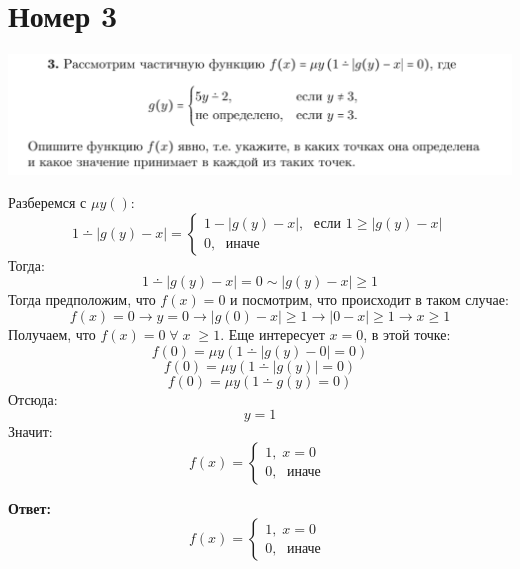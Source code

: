 \documentclass[a4paper,12pt]{article}
\begin{document}
\section*{Номер 3}
\begin{center}
\includegraphics[scale=0.4]{3.png}
\end{center}
Разберемся с $\mu y()$:
\[
1 \dotminus |g(y) - x| = \begin{cases}
1 - |g(y) - x|, \; \text{ если } 1 \geq |g(y) - x|  \\
0, \; \text{ иначе } 
\end{cases}
\]
Тогда:
\[
1 \dotminus |g(y) - x| = 0  \sim |g(y) - x| \geq 1
\]
Тогда предположим, что $f(x) = 0 $ и посмотрим, что происходит в таком случае:
\[
f(x) = 0 \rightarrow y = 0 \rightarrow |g(0) - x| \geq 1 \rightarrow |0 - x| \geq 1 \rightarrow x \geq 1
\]
Получаем, что $f(x) = 0 \;  \forall \; x \; \geq 1$. Еще интересует $x = 0$, в этой точке:
\[
f(0) = \mu y (1 \dotminus |g(y) - 0| = 0)
\]
\[
f(0) = \mu y (1 \dotminus |g(y)| = 0)
\]
\[
f(0) = \mu y (1 \dotminus g(y) = 0)
\]
Отсюда:
\[
y = 1
\]
Значит:
\[
f(x) = \begin{cases}
1, \; x = 0 \; \\
0, \; \text{ иначе }
\end{cases}
\]
\begin{center}
\textbf{Ответ: } 
\[
f(x) = \begin{cases}
1, \; x = 0 \; \\
0, \; \text{ иначе }
\end{cases}
\]
\end{center}
\clearpage
\end{document}
